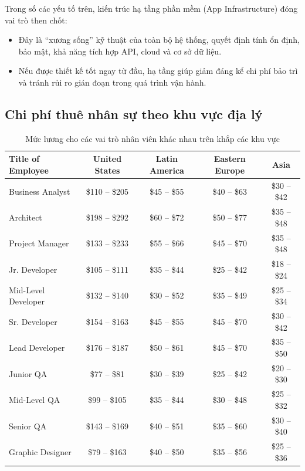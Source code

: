     \begin{flushleft}
      \hspace*{0.8cm}Trong số các yếu tố trên, kiến trúc hạ tầng phần mềm (App Infrastructure) đóng vai trò then chốt:
      \setlength{\leftmargini}{1.5cm}
      \begin{itemize}
          \item Đây là “xương sống” kỹ thuật của toàn bộ hệ thống, quyết định tính ổn định, bảo mật, khả năng tích hợp API, cloud và cơ sở dữ liệu.
          \item Nếu được thiết kế tốt ngay từ đầu, hạ tầng giúp giảm đáng kể chi phí bảo trì và tránh rủi ro gián đoạn trong quá trình vận hành.
      \end{itemize}
    \end{flushleft}

\subsection{Chi phí thuê nhân sự theo khu vực địa lý}

\begin{table}[ht]
  \centering
  \begin{tabular}{|l|c|c|c|c|}
  \hline
  \textbf{Title of Employee} & \textbf{United States} & \textbf{Latin America} & \textbf{Eastern Europe} & \textbf{Asia} \\
  \hline
  Business Analyst    & \$110 -- \$205 & \$45 -- \$55 & \$40 -- \$63 & \$30 -- \$42 \\
  Architect           & \$198 -- \$292 & \$60 -- \$72 & \$50 -- \$77 & \$35 -- \$48 \\
  Project Manager     & \$133 -- \$233 & \$55 -- \$66 & \$45 -- \$70 & \$35 -- \$48 \\
  Jr. Developer       & \$105 -- \$111 & \$35 -- \$44 & \$25 -- \$42 & \$18 -- \$24 \\
  Mid-Level Developer & \$132 -- \$140 & \$30 -- \$52 & \$35 -- \$49 & \$25 -- \$34 \\
  Sr. Developer       & \$154 -- \$163 & \$45 -- \$55 & \$45 -- \$70 & \$30 -- \$42 \\
  Lead Developer      & \$176 -- \$187 & \$50 -- \$61 & \$45 -- \$70 & \$35 -- \$50 \\
  Junior QA           & \$77 -- \$81   & \$30 -- \$39 & \$25 -- \$42 & \$20 -- \$30 \\
  Mid-Level QA        & \$99 -- \$105  & \$35 -- \$44 & \$30 -- \$48 & \$25 -- \$32 \\
  Senior QA           & \$143 -- \$169 & \$40 -- \$51 & \$35 -- \$60 & \$30 -- \$40 \\
  Graphic Designer    & \$79 -- \$163  & \$40 -- \$50 & \$35 -- \$56 & \$25 -- \$36 \\
  \hline
  \end{tabular}
  \caption{Mức lương cho các vai trò nhân viên khác nhau trên khắp các khu vực}
  \label{tab:salary-comparison}
  \end{table}
  
